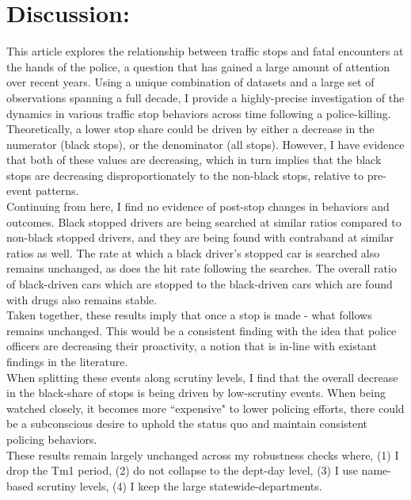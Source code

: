\documentclass[12pt,a4paper]{article}
\begin{document}
\section{Discussion:}

This article explores the relationship between traffic stops and fatal encounters at the hands of the police, a question that has gained a large amount of attention over recent years. Using a unique combination of datasets and a large set of observations spanning a full decade, I provide a highly-precise investigation of the dynamics in various traffic stop behaviors across time following a police-killing. \\

Theoretically, a lower stop share could be driven by either a decrease in the numerator (black stops), or the denominator (all stops). However, I have evidence that both of these values are decreasing, which in turn implies that the black stops are decreasing disproportionately to the non-black stops, relative to pre-event patterns. \\

Continuing from here, I find no evidence of post-stop changes in behaviors and outcomes. Black stopped drivers are being searched at similar ratios compared to non-black stopped drivers, and they are being found with contraband at similar ratios as well. The rate at which a black driver's stopped car is searched also remains unchanged, as does the hit rate following the searches. The overall ratio of black-driven cars which are stopped to the black-driven cars which are found with drugs also remains stable. \\

Taken together, these results imply that once a stop is made - what follows remains unchanged. This would be a consistent finding with the idea that police officers are decreasing their proactivity, a notion that is in-line with existant findings in the literature. \\

When splitting these events along scrutiny levels, I find that the overall decrease in the black-share of stops is being driven by low-scrutiny events. When being watched closely, it becomes more ``expensive" to lower policing efforts, there could be a subconscious desire to uphold the status quo and maintain consistent policing behaviors. \\

These results remain largely unchanged across my robustness checks where, (1) I drop the Tm1 period, (2) do not collapse to the dept-day level, (3) I use name-based scrutiny levels, (4) I keep the large statewide-departments. \\
\end{document}
